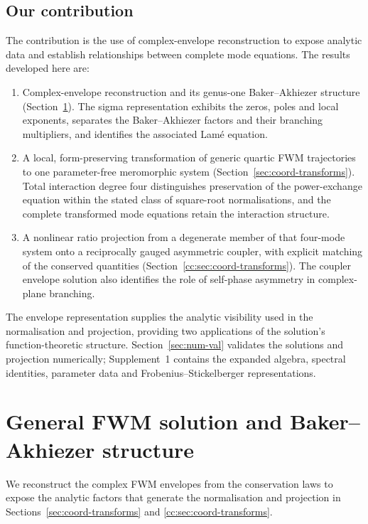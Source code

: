 \documentclass{optica-article}
\numberwithin{equation}{section}
\begin{document}
\subsection{Our contribution}
The contribution is the use of complex-envelope reconstruction to expose analytic data and establish relationships between complete mode equations.
The results developed here are:
\begin{enumerate}
\item Complex-envelope reconstruction and its genus-one Baker--Akhiezer structure (Section~\ref{sec:fwm-solution}). The sigma representation exhibits the zeros, poles and local exponents, separates the Baker--Akhiezer factors and their branching multipliers, and identifies the associated Lam\'e equation.
\item A local, form-preserving transformation of generic quartic FWM trajectories to one parameter-free meromorphic system (Section~\ref{sec:coord-transforms}). Total interaction degree four distinguishes preservation of the power-exchange equation within the stated class of square-root normalisations, and the complete transformed mode equations retain the interaction structure.
\item A nonlinear ratio projection from a degenerate member of that four-mode system onto a reciprocally gauged asymmetric coupler, with explicit matching of the conserved quantities (Section~\ref{cc:sec:coord-transforms}). The coupler envelope solution also identifies the role of self-phase asymmetry in complex-plane branching.
\end{enumerate}
The envelope representation supplies the analytic visibility used in the normalisation and projection, providing two applications of the solution's function-theoretic structure.
Section~\ref{sec:num-val} validates the solutions and projection numerically; Supplement~1 contains the expanded algebra, spectral identities, parameter data and Frobenius--Stickelberger representations.

\section{General FWM solution and Baker--Akhiezer structure}\label{sec:fwm-solution}
We reconstruct the complex FWM envelopes from the conservation laws to expose the analytic factors that generate the normalisation and projection in Sections~\ref{sec:coord-transforms} and \ref{cc:sec:coord-transforms}.
\end{document}
